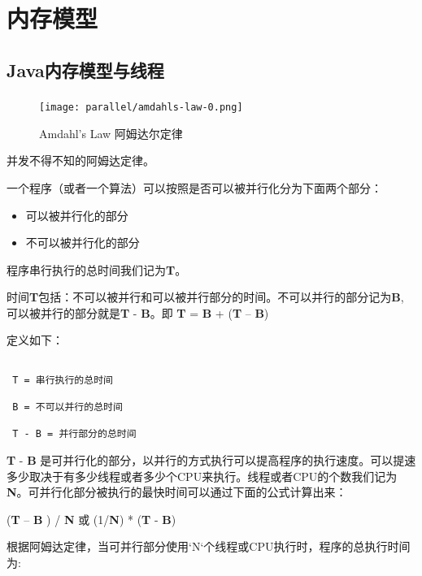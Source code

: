 \chapter{内存模型}

\section{Java内存模型与线程}
 
\subsection{}

\begin{figure}[H]
    \centering
    \texttt{[image: parallel/amdahls-law-0.png]}
    \caption{Amdahl's Law 阿姆达尔定律}
\end{figure}

并发不得不知的阿姆达定律。

一个程序（或者一个算法）可以按照是否可以被并行化分为下面两个部分：

\begin{itemize}
    \item 可以被并行化的部分
    \item 不可以被并行化的部分 
\end{itemize}


程序串行执行的总时间我们记为\textbf{T}。

时间\textbf{T}包括：不可以被并行和可以被并行部分的时间。不可以并行的部分记为\textbf{B}, 可以被并行的部分就是\textbf{T} - \textbf{B}。即 \textbf{T} = \textbf{B} + (\textbf{T} – \textbf{B}) 

定义如下：

\begin{lstlisting}

 T = 串行执行的总时间

 B = 不可以并行的总时间

 T - B = 并行部分的总时间

\end{lstlisting}


\textbf{T} - \textbf{B} 是可并行化的部分，以并行的方式执行可以提高程序的执行速度。可以提速多少取决于有多少线程或者多少个CPU来执行。线程或者CPU的个数我们记为\textbf{N}。可并行化部分被执行的最快时间可以通过下面的公式计算出来：

(\textbf{T} – \textbf{B} ) / \textbf{N} 或 (1/\textbf{N}) * (\textbf{T} - \textbf{B})

根据阿姆达定律，当可并行部分使用`N`个线程或CPU执行时，程序的总执行时间为:

